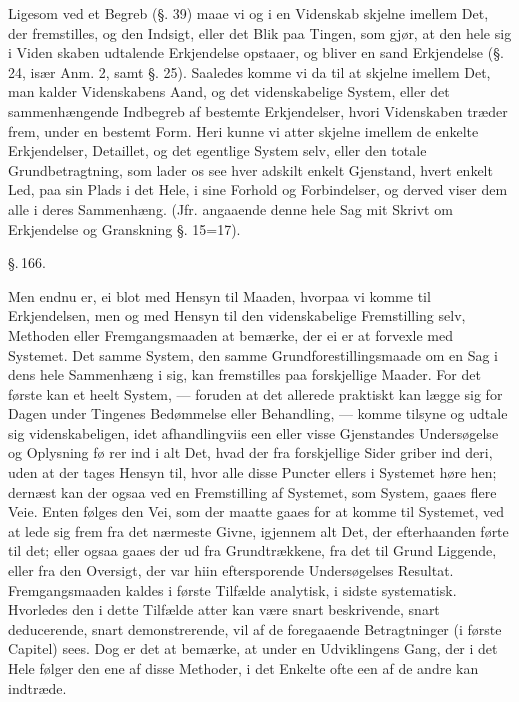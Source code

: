\documentclass[12pt]{book}
\makeatletter
\def\textit#1{#1}%
\def\emph#1{#1}%
\newcommand{\umph}[2][misc]{%
  \@ifundefined{umph@#1@on}{#2}{\emph{#2}}}
\newcommand{\parag}[1]{%
  \par\vspace{0.9\baselineskip}%
  {\centering\textit{\S.\,#1.}\par}%
  \vspace{0.35\baselineskip}%
  \noindent\hspace{\parindent}\ignorespaces
}
\newcommand{\opage}[1]{\marginnote{\footnotesize\textit{[#1]}}}
\makeatother
\begin{document}
Ligesom ved et Begreb (§. 39) maae vi og i en Videnskab skjelne imellem Det,
der fremstilles, og den Indsigt, eller det \umph[schwab]{intellectuelle} Blik
paa Tingen, som gjør, at den hele sig i Viden%
\opage{364}%
skaben udtalende Erkjendelse opstaaer, og bliver en sand Erkjendelse (§. 24,
især Anm. 2, samt §. 25). Saaledes komme vi da til at skjelne imellem Det, man
kalder Videnskabens Aand, og det videnskabelige System, eller det
sammenhængende Indbegreb af bestemte Erkjendelser, hvori Videnskaben træder
frem, under en bestemt Form. Heri kunne vi atter skjelne imellem de enkelte
Erkjendelser, Detaillet, og det egentlige System selv, eller den totale
Grundbetragtning, som lader os see hver adskilt enkelt Gjenstand, hvert enkelt
Led, paa sin Plads i det Hele, i sine Forhold og Forbindelser, og derved viser
dem alle i deres Sammenhæng. (Jfr. angaaende denne hele Sag mit Skrivt om
Erkjendelse og Granskning §. 15=17).

\parag{166}

Men endnu er, ei blot med Hensyn til Maaden, hvorpaa vi komme til
Erkjendelsen, men og med Hensyn til den videnskabelige Fremstilling selv,
Methoden eller Fremgangsmaaden at bemærke, der ei er at forvexle med Systemet.
Det samme System, den samme Grundforestillingsmaade om en Sag i dens hele
Sammenhæng i sig, kan fremstilles paa forskjellige Maader. For det første kan
et heelt System, --- foruden at det allerede praktiskt kan lægge sig for Dagen
under Tingenes Bedømmelse eller Behandling, --- komme tilsyne og udtale sig
videnskabeligen, idet afhandlingviis een eller visse Gjenstandes Undersøgelse
og Oplysning fø%
\opage{365}%
rer ind i alt Det, hvad der fra forskjellige Sider griber ind deri, uden at der
tages Hensyn til, hvor alle disse Puncter ellers i Systemet høre hen; dernæst
kan der ogsaa ved en Fremstilling af Systemet, som System, gaaes flere Veie.
Enten følges den Vei, som der maatte gaaes for at komme til Systemet, ved at
lede sig frem fra det nærmeste Givne, igjennem alt Det, der efterhaanden førte
til det; eller ogsaa gaaes der ud fra Grundtrækkene, fra det til Grund
Liggende, eller fra den Oversigt, der var hiin eftersporende Undersøgelses
Resultat. Fremgangsmaaden kaldes i første Tilfælde analytisk, i sidste
systematisk. Hvorledes den i dette Tilfælde atter kan være snart beskrivende,
snart deducerende, snart demonstrerende, vil af de foregaaende Betragtninger
(i første Capitel) sees. Dog er det at bemærke, at under en Udviklingens Gang,
der i det Hele følger den ene af disse Methoder, i det Enkelte ofte een af de
andre kan indtræde.
\end{document}
